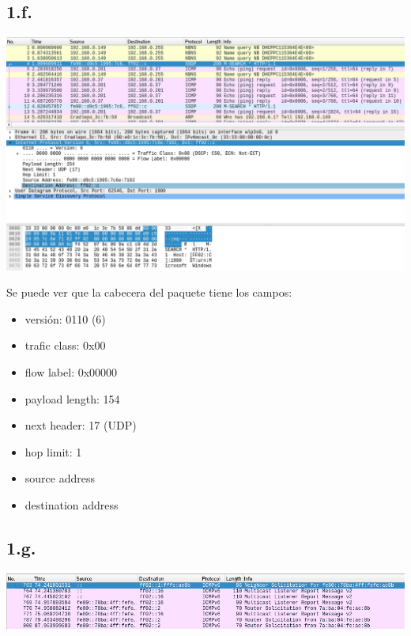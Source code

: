 \documentclass[11pt]{article}
\begin{document}
\subsection*{1.f.}
\label{sec:org32d59f4}
\begin{center}
\includegraphics[width=.9\linewidth]{./1f.png}
\end{center}
Se puede ver que la cabecera del paquete tiene los campos:
\begin{itemize}
\item versión: 0110 (6)
\item trafic class: 0x00
\item flow label: 0x00000
\item payload length: 154
\item next header: 17 (UDP)
\item hop limit: 1
\item source address
\item destination address
\end{itemize}
\newpage
\subsection*{1.g.}
\label{sec:org3745e57}
\begin{center}
\includegraphics[width=.9\linewidth]{./1g.png}
\end{center}
\end{document}
